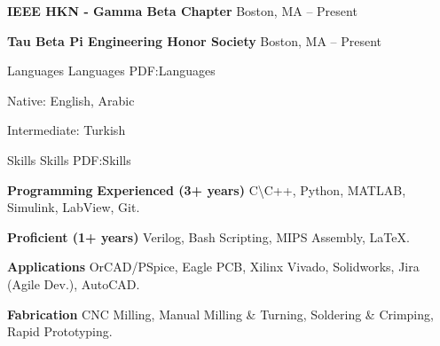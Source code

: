 \documentclass[letterpaper,MMMyyyy,nonstopmode]{simpleresumecv}
\begin{document}
\begin{Body}
\Entry
\textbf{IEEE HKN - Gamma Beta Chapter}
\newline
Boston, MA
\hfill
{} --
Present

\Entry
\textbf{Tau Beta Pi Engineering Honor Society}
\newline
Boston, MA
\hfill
{} --
Present





\Section
{Languages}
{Languages}
{PDF:Languages}

\BulletItem
Native: English, Arabic

\Gap
\BulletItem
Intermediate: Turkish


\Section
{Skills}
{Skills}
{PDF:Skills}

\Entry
\textbf{Programming}
\BulletItem
\textbf{Experienced (3+ years)}
\newline
C\textbackslash C++,
Python,
MATLAB,
Simulink,
LabView,
Git.

\BulletItem
\textbf{Proficient (1+ years)}
\newline
Verilog,
Bash Scripting,
MIPS Assembly,
{\LaTeX}.

\textbf{Applications}
\newline
OrCAD/PSpice,
Eagle PCB,
Xilinx Vivado,
Solidworks,
Jira (Agile Dev.),
AutoCAD.

\textbf{Fabrication}
\newline
CNC Milling,
Manual Milling \& Turning,
Soldering \& Crimping,
Rapid Prototyping.









\end{Body}
\end{document}
